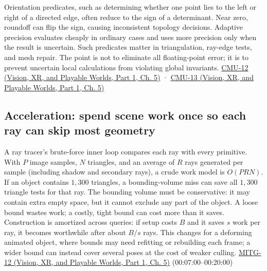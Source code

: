 Orientation predicates, such as determining whether one point lies to the left or right of a directed edge, often reduce to the sign of a determinant. Near zero, roundoff can flip the sign, causing inconsistent topology decisions. Adaptive precision evaluates cheaply in ordinary cases and uses more precision only when the result is uncertain. Such predicates matter in triangulation, ray-edge tests, and mesh repair. The point is not to eliminate all floating-point error; it is to prevent uncertain local calculations from violating global invariants. \href{../07-Vision-XR-and-Playable-Worlds-P01/main.pdf\#nameddest=04-visual-computing-ii-ch036-cmu-12---geometric-queries}{CMU-12 (Vision, XR, and Playable Worlds, Part 1, Ch. 5)} · \href{../07-Vision-XR-and-Playable-Worlds-P01/main.pdf\#nameddest=04-visual-computing-ii-ch036-cmu-13---spatial-data-structures}{CMU-13 (Vision, XR, and Playable Worlds, Part 1, Ch. 5)}

\subsection{Acceleration: spend scene work once so each ray can skip most geometry}\label{04-visual-computing-ii-ch029-acceleration-spend-scene-work-once-so-each-ray-can-skip-most-geometry}

\hypertarget{04-visual-computing-ii-ch029-acceleration-spend-scene-work-once-so-each-ray-can-skip-most-geometry}{}

A ray tracer's brute-force inner loop compares each ray with every primitive. With \(P\) image samples, \(N\) triangles, and an average of \(R\) rays generated per sample (including shadow and secondary rays), a crude work model is \(O(PRN)\). If an object contains \(1{,}300\) triangles, a bounding-volume miss can save all \(1{,}300\) triangle tests for that ray. The bounding volume must be conservative: it may contain extra empty space, but it cannot exclude any part of the object. A loose bound wastes work; a costly, tight bound can cost more than it saves. Construction is amortized across queries: if setup costs \(B\) and it saves \(s\) work per ray, it becomes worthwhile after about \(B/s\) rays. This changes for a deforming animated object, where bounds may need refitting or rebuilding each frame; a wider bound can instead cover several poses at the cost of weaker culling. \href{../07-Vision-XR-and-Playable-Worlds-P01/main.pdf\#nameddest=04-visual-computing-ii-ch036-mitg-12---ray-tracing-ii}{MITG-12 (Vision, XR, and Playable Worlds, Part 1, Ch. 5)} (00:07:00--00:20:00)

